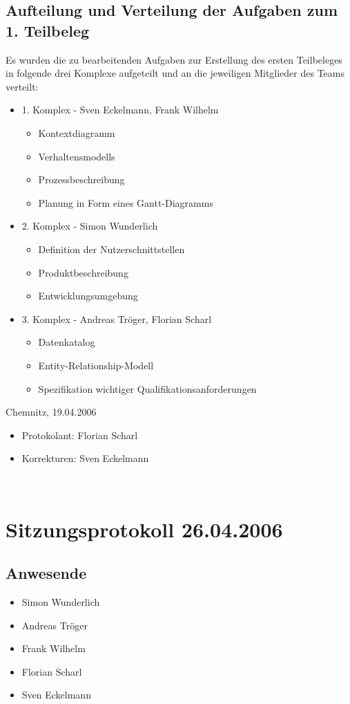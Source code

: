 			\subsection{Aufteilung und Verteilung der Aufgaben zum 1. Teilbeleg}
			Es wurden die zu bearbeitenden Aufgaben zur Erstellung des ersten Teilbeleges in folgende drei Komplexe aufgeteilt und an die jeweiligen Mitglieder des Teams verteilt:
			\begin{itemize}
				\item 1. Komplex - Sven Eckelmann, Frank Wilhelm
					\begin{itemize}	
						\item Kontextdiagramm
						\item Verhaltensmodells
						\item Prozessbeschreibung
						\item Planung in Form eines Gantt-Diagramms
					\end{itemize}
				\item 2. Komplex - Simon Wunderlich
					\begin{itemize}
						\item Definition der Nutzerschnittstellen
						\item Produktbeschreibung
						\item Entwicklungsumgebung
					\end{itemize}
				\item 3. Komplex - Andreas Tröger, Florian Scharl
					\begin{itemize}
						\item Datenkatalog
						\item Entity-Relationship-Modell
						\item Spezifikation wichtiger Qualifikationsanforderungen
					\end{itemize}
			\end{itemize}
			Chemnitz, 19.04.2006
			\begin{itemize}
				\item Protokolant: Florian Scharl
				\item Korrekturen: Sven Eckelmann
			\end{itemize}
\newpage
﻿
		\section{Sitzungsprotokoll 26.04.2006}
		\subsection{Anwesende}
		\begin{itemize}
			\item Simon Wunderlich
			\item Andreas Tröger
			\item Frank Wilhelm
			\item Florian Scharl
			\item Sven Eckelmann
		\end{itemize}
